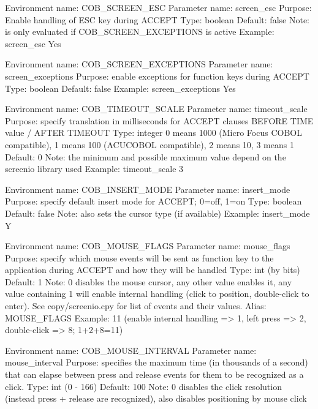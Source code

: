 Environment name:  COB_SCREEN_ESC
  Parameter name:  screen_esc
         Purpose:  Enable handling of ESC key during ACCEPT
            Type:  boolean
         Default:  false
            Note:  is only evaluated if COB_SCREEN_EXCEPTIONS is active
         Example:  screen_esc Yes

Environment name:  COB_SCREEN_EXCEPTIONS
  Parameter name:  screen_exceptions
         Purpose:  enable exceptions for function keys during ACCEPT
            Type:  boolean
         Default:  false
         Example:  screen_exceptions Yes

Environment name:  COB_TIMEOUT_SCALE
  Parameter name:  timeout_scale
         Purpose:  specify translation in milliseconds for ACCEPT clauses
                   BEFORE TIME value / AFTER TIMEOUT
            Type:  integer
                   0 means 1000 (Micro Focus COBOL compatible), 1 means 100
                   (ACUCOBOL compatible), 2 means 10, 3 means 1
         Default:  0
            Note:  the minimum and possible maximum value depend on the
                   screenio library used
         Example:  timeout_scale 3

Environment name:  COB_INSERT_MODE
  Parameter name:  insert_mode
         Purpose:  specify default insert mode for ACCEPT; 0=off, 1=on
            Type:  boolean
         Default:  false
            Note:  also sets the cursor type (if available)
         Example:  insert_mode Y

Environment name:  COB_MOUSE_FLAGS
  Parameter name:  mouse_flags
         Purpose:  specify which mouse events will be sent as function key
                   to the application during ACCEPT and how they will be
                   handled
            Type:  int (by bits)
         Default:  1
            Note:  0 disables the mouse cursor, any other value enables it,
                   any value containing 1 will enable internal handling (click
                   to position, double-click to enter).
                   See copy/screenio.cpy for list of events and their values.
           Alias:  MOUSE_FLAGS
         Example:  11 (enable internal handling => 1, left press => 2,
                       double-click => 8; 1+2+8=11)

Environment name:  COB_MOUSE_INTERVAL
  Parameter name:  mouse_interval
         Purpose:  specifies the maximum time (in thousands of a second)
                   that can elapse between press and release events for them
                   to be recognized as a click.
            Type:  int (0 - 166)
         Default:  100
            Note:  0 disables the click resolution (instead press + release
                   are recognized), also disables positioning by mouse click

